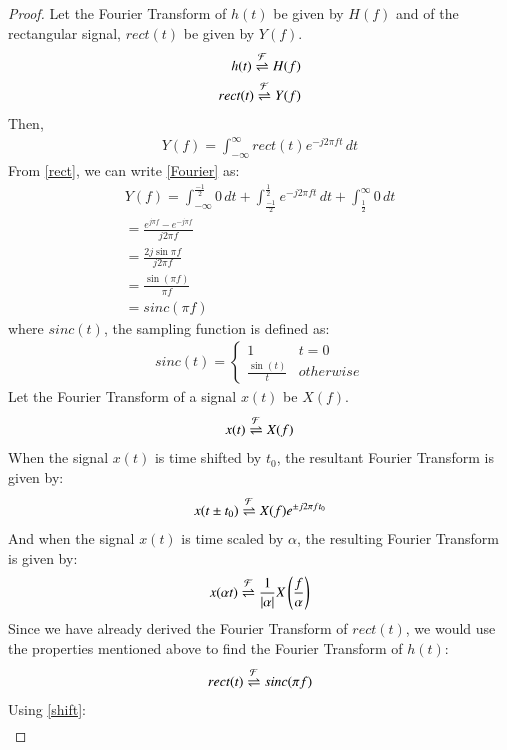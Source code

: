 \documentclass[journal,12pt,twocolumn]{IEEEtran}
\begin{document}
\begin{proof}
Let the Fourier Transform of $h(t)$ be given by $H(f)$ and of the rectangular signal, $rect(t)$ be given by $Y(f)$.
\begin{align}
    h(t) \overset{\mathcal{F}}{ \rightleftharpoons} H(f)\\
    rect(t) \overset{\mathcal{F}}{ \rightleftharpoons} Y(f)
    \end{align}
    Then,
    \begin{align}
    Y(f) = \int_{-\infty}^\infty rect(t)e^{-j2\pi f t}\,dt
    \label{Fourier}
\end{align}
From \eqref{rect}, we can write \eqref{Fourier} as:
\begin{align}
   Y(f) = \int_{-\infty}^\frac{-1}{2} 0\,dt + \int_{\frac{-1}{2}}^\frac{1}{2} e^{-j2\pi ft}\,dt + \int_\frac{1}{2}^\infty 0\,dt\\
    = \frac{e^{j\pi f} - e^{-j \pi f}}{j2\pi f}\\
     = \frac{2j\sin{\pi f}}{j2\pi f}\\
      = \frac{\sin (\pi f)}{\pi f}\\
       = sinc(\pi f)
\end{align}
where $sinc(t)$, the sampling function is defined as:
\begin{align}
    sinc(t) = 
    \begin{cases}
    1 & t = 0\\
    \frac{\sin(t)}{t} & otherwise
    \end{cases}
\end{align}
Let the Fourier Transform of a signal $x(t)$ be $X(f)$.
\begin{align}
    x(t) \overset{\mathcal{F}}{ \rightleftharpoons} X(f)
\end{align}
When the signal $x(t)$ is time shifted by $t_0$, the resultant Fourier Transform is given by:
\begin{align}
    x(t \pm t_0) \overset{\mathcal{F}}{ \rightleftharpoons} X(f)e^{\pm j2\pi ft_0}
    \label{shift}
\end{align}
And when the signal $x(t)$ is time scaled by $\alpha$, the resulting Fourier Transform is given by:
\begin{align}
    x(\alpha t) \overset{\mathcal{F}}{ \rightleftharpoons} \frac{1}{\left\vert\alpha\right\vert}X\left(\frac{f}{\alpha}\right)
    \label{scale}
\end{align}
Since we have already derived the Fourier Transform of $rect(t)$, we would use the properties mentioned above to find the Fourier Transform of $h(t)$:
\begin{align}
    rect(t) \overset{\mathcal{F}}{ \rightleftharpoons} sinc(\pi f)
\end{align}
Using \eqref{shift}:
\begin{align}

\end{align}
\end{proof}
\end{document}
